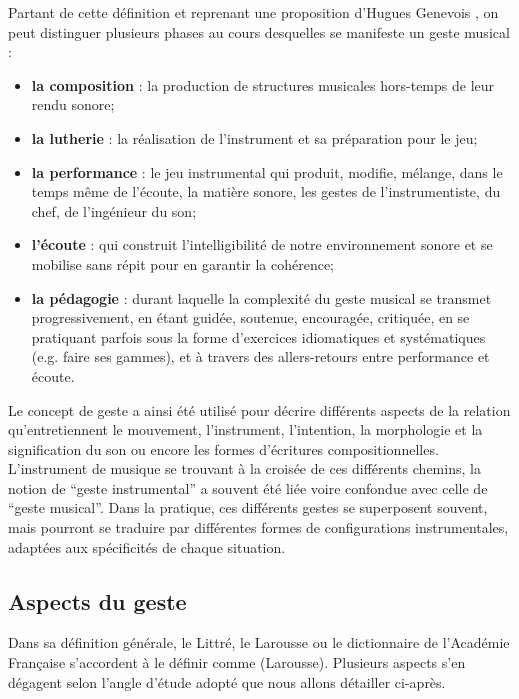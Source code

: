 \indent Partant de cette définition et reprenant une proposition d'Hugues Genevois \cite{genevois_geste_1999}, on peut distinguer plusieurs phases au cours desquelles se manifeste un geste musical :
\vspace{-1em}
\begin{itemize}[noitemsep]
\item \textbf{la composition} : la production de structures musicales hors-temps de leur rendu sonore;
\item \textbf{la lutherie} : la réalisation de l'instrument et sa préparation pour le jeu;
\item \textbf{la performance} : le jeu instrumental qui produit, modifie, mélange, dans le temps même de l'écoute, la matière sonore, les gestes de l'instrumentiste, du chef, de l'ingénieur du son;
\item \textbf{l'écoute} : qui construit l'intelligibilité de notre environnement sonore et se mobilise sans répit pour en garantir la cohérence;
\item \textbf{la pédagogie} : durant laquelle la complexité du geste musical se transmet progressivement, en étant guidée, soutenue, encouragée, critiquée, en se pratiquant parfois sous la forme d'exercices idiomatiques et systématiques (e.g. faire ses gammes), et à travers des allers-retours entre performance et écoute.
\end{itemize}
\noindent Le concept de geste a ainsi été utilisé pour décrire différents aspects de la relation qu'entretiennent le mouvement, l'instrument, l'intention, la morphologie et la signification du son ou encore les formes d'écritures compositionnelles. L'instrument de musique se trouvant à la croisée de ces différents chemins, la notion de ``geste instrumental'' a souvent été liée voire confondue avec celle de ``geste musical''. Dans la pratique, ces différents gestes se superposent souvent, mais pourront se traduire par différentes formes de configurations instrumentales, adaptées aux spécificités de chaque situation.

\subsection{Aspects du geste}

\noindent Dans sa définition générale, le Littré, le Larousse ou le dictionnaire de l'Académie Française s'accordent à le définir comme  (Larousse). Plusieurs aspects s'en dégagent selon l'angle d'étude adopté que nous allons détailler ci-après.


